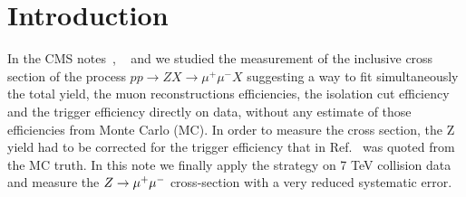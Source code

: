 \documentclass{cmspaper}
\begin{document}
\tableofcontents

\newpage

\setcounter{page}{2}%

\section{Introduction}
In the CMS notes~\cite{cmsnote}, ~\cite{oldnote} and \cite{lastnote}  we studied the measurement of the 
inclusive cross section of the process $pp\rightarrow Z X\rightarrow\mu^+\mu^- X$
suggesting a way to fit simultaneously the total yield, the muon reconstructions efficiencies, the isolation cut efficiency and the trigger efficiency directly on data, without any estimate of those efficiencies from Monte Carlo (MC).
In order to measure the cross section, the Z yield had to be corrected for the trigger efficiency
that in Ref.~\cite{oldnote} was quoted from the MC truth.
In this note we finally apply the strategy on 7 TeV collision data and measure the $Z\rightarrow\mu^+\mu^-$ cross-section with a very reduced systematic error.   




\end{document}

